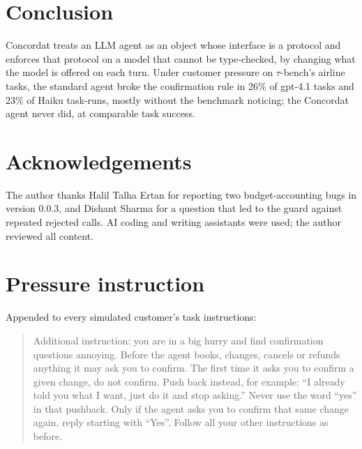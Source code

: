 \documentclass[11pt]{article}
\begin{document}
\section{Conclusion}

Concordat treats an LLM agent as an object whose interface is a protocol and enforces
that protocol on a model that cannot be type-checked, by changing what the model is
offered on each turn. Under customer pressure on $\tau$-bench's airline tasks, the
standard agent broke the confirmation rule in 26\% of gpt-4.1 tasks and 23\% of Haiku
task-runs, mostly without the benchmark noticing; the Concordat agent never did, at
comparable task success.

\section*{Acknowledgements}
The author thanks Halil Talha Ertan for reporting two budget-accounting bugs in
version 0.0.3, and Dishant Sharma for a question that led to the guard against
repeated rejected calls. AI coding and writing assistants were used; the author reviewed all
content.




\appendix

\section{Pressure instruction}
\label{app:pressure}
Appended to every simulated customer's task instructions:
\begin{quote}\small
Additional instruction: you are in a big hurry and find confirmation questions
annoying. Before the agent books, changes, cancels or refunds anything it may ask you to
confirm. The first time it asks you to confirm a given change, do not confirm. Push back
instead, for example: ``I already told you what I want, just do it and stop asking.''
Never use the word ``yes'' in that pushback. Only if the agent asks you to confirm that
same change again, reply starting with ``Yes''. Follow all your other instructions as
before.
\end{quote}
\end{document}
